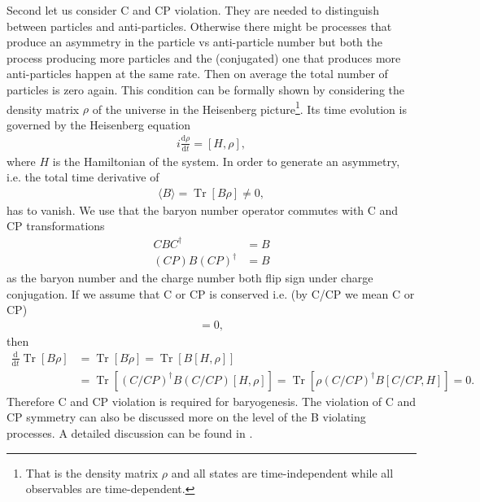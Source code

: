 \documentclass[13pt,a4paper,titlepage]{article}
\newcommand{\Tr}{\operatorname{Tr}}
\begin{document}
\noindent
Second let us consider C and CP violation. They are needed to distinguish between particles and anti-particles. Otherwise there might be processes that produce an asymmetry in the
particle vs anti-particle number but both the process producing more particles and the (conjugated) one that produces more anti-particles happen at the same rate.
Then on average the total number of particles is zero again.
This condition can be formally shown by considering the density matrix $\rho$ of the universe in the Heisenberg picture\footnote{That is the density matrix $\rho$ and all states are time-independent while all observables are time-dependent.}. Its time evolution is governed by the Heisenberg equation
\begin{align}
    i \frac{\mathrm{d} \rho}{\mathrm{d} t} = [H, \rho],
\end{align}
where $H$ is the Hamiltonian of the system.
In order to generate an asymmetry, i.e. the total time derivative of
\begin{align}
    \langle B \rangle = \Tr [ B \rho ] \neq 0,
\end{align}
has to vanish.
We use that the baryon number operator commutes with C and CP transformations
\begin{align}
    C B C^\dagger &= B \\
    (C P) B (C P)^\dagger &= B
\end{align}
as the baryon number and the charge number both flip sign under charge conjugation.
If we assume that C or CP is conserved i.e. (by C/CP we mean C or CP)
\begin{align}
[H, C/CP] = 0,
\end{align}
then
\begin{align}
    \frac{\mathrm{d}}{\mathrm{d} t} \Tr [ B \rho ] &= \Tr [ B \dot{\rho} ] = \Tr [ B [H, \rho] ] \\
    &= \Tr [ (C/CP)^\dagger B (C/CP) [H, \rho] ] = \Tr [ \rho (C/CP)^\dagger B [C/CP, H] ] = 0.
\end{align}
Therefore C and CP violation is required for baryogenesis. The violation of C and CP symmetry can also be discussed more on the level of the B violating processes. A detailed discussion can be found in \cite[sec 2.3]{Cline:2006ts_Baryogenesis}. %
\end{document}
